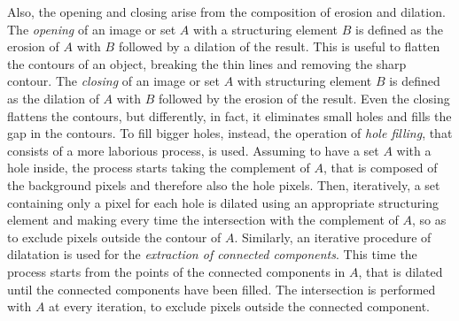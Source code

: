 Also, the opening and closing arise from the composition of erosion and dilation. The \textit{opening} of an image or set $A$ with a structuring element $B$ is defined as the erosion of $A$ with $B$ followed by a dilation of the result. This is useful to flatten the contours of an object, breaking the thin lines and removing the sharp contour. The \textit{closing} of an image or set $A$ with structuring element $B$ is defined as the dilation of $A$ with $B$ followed by the erosion of the result. Even the closing flattens the contours, but differently, in fact, it eliminates small holes and fills the gap in the contours. To fill bigger holes, instead, the operation of \textit{hole filling}, that consists of a more laborious process, is used. Assuming to have a set $A$ with a hole inside, the process starts taking the complement of $A$, that is composed of the background pixels and therefore also the hole pixels. Then, iteratively, a set containing only a pixel for each hole is dilated using an appropriate structuring element and making every time the intersection with the complement of $A$, so as to exclude pixels outside the contour of $A$.
Similarly, an iterative procedure of dilatation is used for the \textit{extraction of connected components}. This time the process starts from the points of the connected components in $A$, that is dilated until the connected components have been filled. The intersection is performed with $A$ at every iteration, to exclude pixels outside the connected component. 

